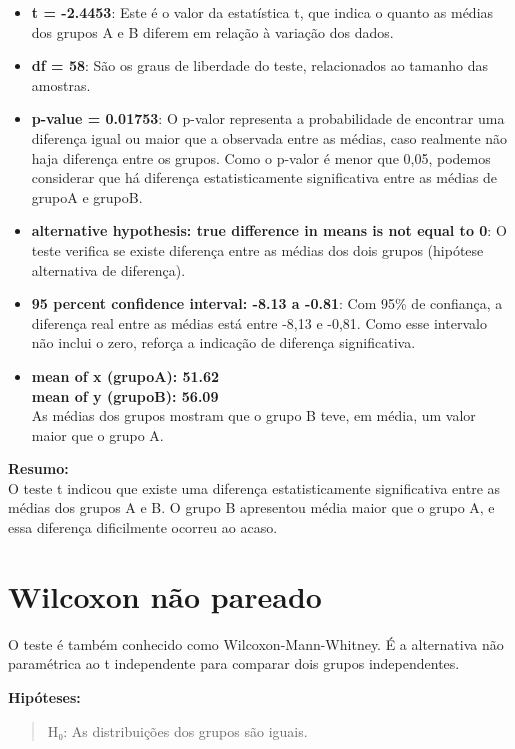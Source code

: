 \documentclass[
]{book}
\providecommand{\tightlist}{%
  \setlength{\itemsep}{0pt}\setlength{\parskip}{0pt}}
\begin{document}
\begin{itemize}
\tightlist
\item
  \textbf{t = -2.4453}: Este é o valor da estatística t, que indica o quanto as médias dos grupos A e B diferem em relação à variação dos dados.
\item
  \textbf{df = 58}: São os graus de liberdade do teste, relacionados ao tamanho das amostras.
\item
  \textbf{p-value = 0.01753}: O p-valor representa a probabilidade de encontrar uma diferença igual ou maior que a observada entre as médias, caso realmente não haja diferença entre os grupos. Como o p-valor é menor que 0,05, podemos considerar que há diferença estatisticamente significativa entre as médias de grupoA e grupoB.
\item
  \textbf{alternative hypothesis: true difference in means is not equal to 0}: O teste verifica se existe diferença entre as médias dos dois grupos (hipótese alternativa de diferença).
\item
  \textbf{95 percent confidence interval: -8.13 a -0.81}: Com 95\% de confiança, a diferença real entre as médias está entre -8,13 e -0,81. Como esse intervalo não inclui o zero, reforça a indicação de diferença significativa.
\item
  \textbf{mean of x (grupoA): 51.62}\\
  \textbf{mean of y (grupoB): 56.09}\\
  As médias dos grupos mostram que o grupo B teve, em média, um valor maior que o grupo A.
\end{itemize}

\textbf{Resumo:}\\
O teste t indicou que existe uma diferença estatisticamente significativa entre as médias dos grupos A e B. O grupo B apresentou média maior que o grupo A, e essa diferença dificilmente ocorreu ao acaso.

\section{Wilcoxon não pareado}\label{wilcoxon-nuxe3o-pareado}

O teste é também conhecido como Wilcoxon-Mann-Whitney. É a alternativa não paramétrica ao t independente para comparar dois grupos independentes.

\textbf{Hipóteses:}

\begin{quote}
H₀: As distribuições dos grupos são iguais.
\end{quote}
\end{document}
